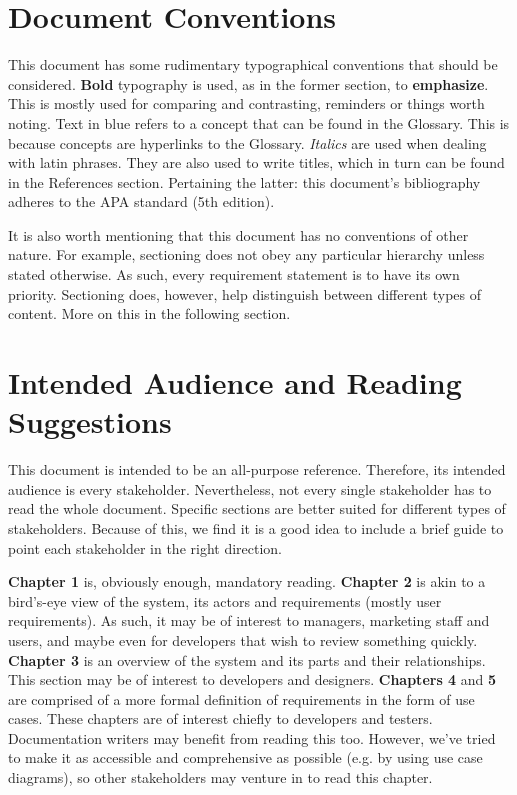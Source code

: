 \documentclass{scrreprt}
\begin{document}
\section{Document Conventions}
This document has some rudimentary typographical conventions that should be considered. \textbf{Bold} typography is used, as in the former section, to \textbf{emphasize}. This is mostly used for comparing and contrasting,
reminders or things worth noting. Text in blue refers to a concept that can be found in the Glossary. This is because concepts are hyperlinks to the Glossary. \textsl{Italics} are used when dealing with latin phrases.
They are also used to write titles, which in turn can be found in the References section. Pertaining the latter: this document's bibliography adheres to the APA standard (5th edition).

It is also worth mentioning that this document has no conventions of other nature. For example, sectioning does not obey any particular hierarchy unless stated otherwise. As such, every requirement statement is to have
its own priority. Sectioning does, however, help distinguish between different types of content. More on this in the following section. 

\section{Intended Audience and Reading Suggestions}
This document is intended to be an all-purpose reference. Therefore, its intended audience is every \gls{stakeholder}. Nevertheless, not every single \gls{stakeholder} has to read the whole document. Specific sections are
better suited for different types of \glspl{stakeholder}. Because of this, we find it is a good idea to include a brief guide to point each \gls{stakeholder} in the right direction.

\textbf{Chapter 1} is, obviously enough, mandatory reading. \textbf{Chapter 2} is akin to a bird's-eye view of the system, its actors and requirements (mostly \gls{user} requirements). As such, it may be of interest to 
managers, marketing staff and \glspl{user}, and maybe even for developers that wish to review something quickly. \textbf{Chapter 3} is an overview of the system and its parts and their relationships. This section may be of 
interest to developers and designers. \textbf{Chapters 4} and \textbf{5} are comprised of a more formal definition of requirements in the form of use cases. These chapters are of interest chiefly to developers and testers.
Documentation writers may benefit from reading this too. However, we've tried to make it as accessible
and comprehensive as possible (e.g. by using use case diagrams), so other \glspl{stakeholder} may venture in 
to read this chapter.
\end{document}
